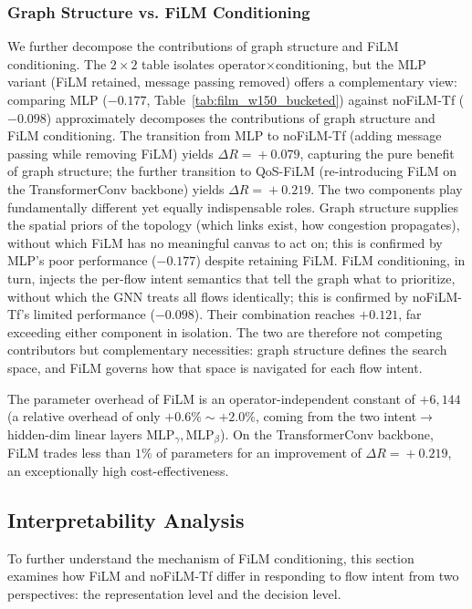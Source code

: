 \subsubsection{Graph Structure vs. FiLM Conditioning}
\label{sec:exp:decompose}
We further decompose the contributions of graph structure and FiLM conditioning. The $2\times2$ table isolates operator$\times$conditioning, but the MLP variant (FiLM retained, message passing removed) offers a complementary view: comparing MLP ($-0.177$, Table~\ref{tab:film_w150_bucketed}) against noFiLM-Tf ($-0.098$) approximately decomposes the contributions of graph structure and FiLM conditioning. The transition from MLP to noFiLM-Tf (adding message passing while removing FiLM) yields $\Delta R\!=\!+0.079$, capturing the pure benefit of graph structure; the further transition to QoS-FiLM (re-introducing FiLM on the TransformerConv backbone) yields $\Delta R\!=\!+0.219$. The two components play fundamentally different yet equally indispensable roles. Graph structure supplies the spatial priors of the topology (which links exist, how congestion propagates), without which FiLM has no meaningful canvas to act on; this is confirmed by MLP's poor performance ($-0.177$) despite retaining FiLM. FiLM conditioning, in turn, injects the per-flow intent semantics that tell the graph what to prioritize, without which the GNN treats all flows identically; this is confirmed by noFiLM-Tf's limited performance ($-0.098$). Their combination reaches $+0.121$, far exceeding either component in isolation. The two are therefore not competing contributors but complementary necessities: graph structure defines the search space, and FiLM governs how that space is navigated for each flow intent.

The parameter overhead of FiLM is an operator-independent constant of $+6{,}144$ (a relative overhead of only $+0.6\%\sim+2.0\%$, coming from the two intent$\to$hidden-dim linear layers $\mathrm{MLP}_\gamma,\mathrm{MLP}_\beta$). On the TransformerConv backbone, FiLM trades less than $1\%$ of parameters for an improvement of $\Delta R\!=\!+0.219$, an exceptionally high cost-effectiveness.



\subsection{Interpretability Analysis}
\label{sec:exp:interp}

To further understand the mechanism of FiLM conditioning, this section examines how FiLM and noFiLM-Tf differ in responding to flow intent from two perspectives: the representation level and the decision level.




